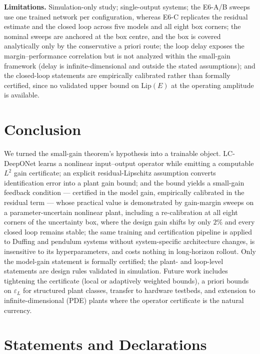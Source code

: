 \documentclass[11pt]{article}
\newcommand{\Ltwo}{L^2}
\newcommand{\epsL}{\varepsilon_L}
\begin{document}
\textbf{Limitations.} Simulation-only study; single-output systems; the
E6-A/B sweeps use one trained network per configuration, whereas E6-C
replicates the residual estimate and the closed loop across five models and
all eight box corners; the nominal sweeps are anchored at the box centre, and
the box is covered analytically only by the conservative a priori route; the
loop delay exposes the margin--performance correlation but is not analyzed
within the small-gain framework (delay is infinite-dimensional and outside
the stated assumptions); and the closed-loop statements are empirically
calibrated rather than formally certified, since no validated upper bound on
$\mathrm{Lip}(E)$ at the operating amplitude is available.

\section{Conclusion}\label{sec:conclusion}
We turned the small-gain theorem's hypothesis into a trainable object.
LC-DeepONet learns a nonlinear input--output operator while emitting a
computable $\Ltwo$ gain certificate; an explicit residual-Lipschitz
assumption converts identification error into a plant gain bound; and the
bound yields a small-gain feedback condition --- certified in the model
gain, empirically calibrated in the residual term --- whose practical value is
demonstrated by gain-margin sweeps on a parameter-uncertain nonlinear plant,
including a re-calibration at all eight corners of the uncertainty box, where
the design gain shifts by only $2\%$ and every closed loop remains stable;
the same training and certification pipeline is applied to Duffing
and pendulum systems without system-specific architecture changes, is
insensitive to its hyperparameters, and costs nothing in
long-horizon rollout. Only the model-gain statement is formally certified;
the plant- and loop-level statements are design rules validated in
simulation. Future work
includes tightening the certificate (local or adaptively weighted bounds),
a priori bounds on $\epsL$ for structured plant classes, transfer to hardware
testbeds, and extension to infinite-dimensional (PDE) plants where the
operator certificate is the natural currency.

\section*{Statements and Declarations}
\end{document}
